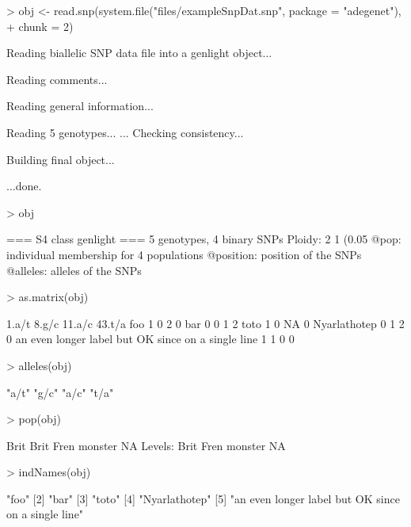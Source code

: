 \documentclass{article}
\begin{document}
\begin{Schunk}
\begin{Sinput}
> obj <- read.snp(system.file("files/exampleSnpDat.snp", package = "adegenet"), 
+     chunk = 2)
\end{Sinput}
\begin{Soutput}
 Reading biallelic SNP data file into a genlight object... 


 Reading comments... 

 Reading general information... 

 Reading 5 genotypes... 
...
 Checking consistency... 

 Building final object... 

...done.
\end{Soutput}
\begin{Sinput}
> obj
\end{Sinput}
\begin{Soutput}
 === S4 class genlight ===
 5 genotypes,  4 binary SNPs
 Ploidy: 2
 1 (0.05 %
 @pop: individual membership for 4 populations
 @position: position of the SNPs
 @alleles: alleles of the SNPs
\end{Soutput}
\begin{Sinput}
> as.matrix(obj)
\end{Sinput}
\begin{Soutput}
                                                   1.a/t 8.g/c 11.a/c 43.t/a
foo                                                    1     0      2      0
bar                                                    0     0      1      2
toto                                                   1     0     NA      0
Nyarlathotep                                           0     1      2      0
an even longer label but OK since on a single line     1     1      0      0
\end{Soutput}
\begin{Sinput}
> alleles(obj)
\end{Sinput}
\begin{Soutput}
[1] "a/t" "g/c" "a/c" "t/a"
\end{Soutput}
\begin{Sinput}
> pop(obj)
\end{Sinput}
\begin{Soutput}
[1] Brit    Brit    Fren    monster NA     
Levels: Brit Fren monster NA
\end{Soutput}
\begin{Sinput}
> indNames(obj)
\end{Sinput}
\begin{Soutput}
[1] "foo"                                               
[2] "bar"                                               
[3] "toto"                                              
[4] "Nyarlathotep"                                      
[5] "an even longer label but OK since on a single line"
\end{Soutput}
\end{Schunk}
\end{document}
